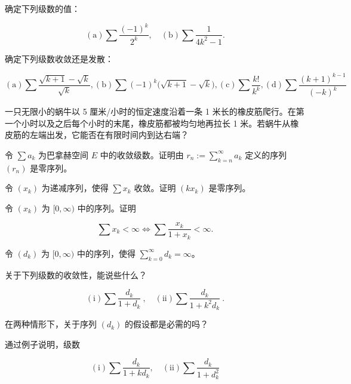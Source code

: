 \begin{exercises}
\item

确定下列级数的值：

\[
\mathrm{(a)}\sum\frac{(-1)^{k}}{2^{k}},\quad\mathrm{(b)}\sum\frac{1}{4k^{2}-1}.
\]
\item

确定下列级数收敛还是发散：

\[
\mathrm{(a)}\sum\frac{\sqrt{k+1}-\sqrt{k}}{\sqrt{k}},\mathrm{(b)}\sum(-1)^{k}\big(\sqrt{k+1}-\sqrt{k}\big),\mathrm{(c)}\sum\frac{k!}{k^{k}},\mathrm{(d)}\sum\frac{(k+1)^{k-1}}{(-k)^{k}}
\]
\item

一只无限小的蜗牛以 5 厘米/小时的恒定速度沿着一条 1 米长的橡皮筋爬行。在第一个小时以及之后每个小时的末尾，橡皮筋都被均匀地再拉长 1 米。若蜗牛从橡皮筋的左端出发，它能否在有限时间内到达右端？

\item

令 $ \sum a_k $ 为巴拿赫空间 $ E $ 中的收敛级数。证明由 $ r_n := \sum_{k=n}^{\infty} a_k $ 定义的序列 $ (r_n) $ 是零序列。

\item

令 $ (x_k) $ 为递减序列，使得 $ \sum x_k $ 收敛。证明 $ (kx_k) $ 是零序列。

\item

令 $ (x_{k}) $ 为 $ [0,\infty) $ 中的序列。证明

\[
\sum x_{k}<\infty\Longleftrightarrow\sum\frac{x_{k}}{1+x_{k}}<\infty.
\]
\item

令 $ (d_k) $ 为 $ [0,\infty) $ 中的序列，使得 $ \sum_{k=0}^{\infty}d_k=\infty $。

\begin{items}
\item

关于下列级数的收敛性，能说些什么？

\[
\mathrm{(i)}\sum\frac{d_{k}}{1+d_{k}}~,\quad\mathrm{(ii)}\sum\frac{d_{k}}{1+k^{2}d_{k}}~.
\]

在两种情形下，关于序列 $ (d_{k}) $ 的假设都是必需的吗？

\item

通过例子说明，级数

\[
(\mathrm{i})\sum\frac{d_{k}}{1+kd_{k}},\quad(\mathrm{ii})\sum\frac{d_{k}}{1+d_{k}^{2}}
\]


\end{items}
\end{exercises}
